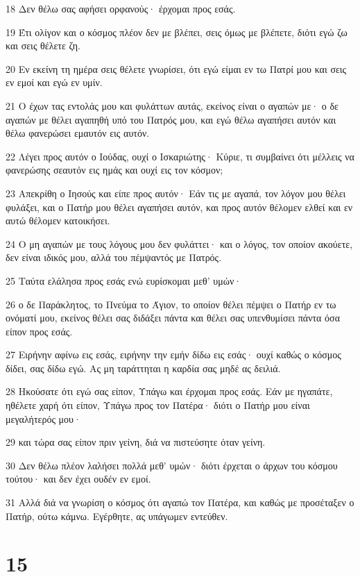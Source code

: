 \par 18 Δεν θέλω σας αφήσει ορφανούς· έρχομαι προς εσάς.
\par 19 Έτι ολίγον και ο κόσμος πλέον δεν με βλέπει, σεις όμως με βλέπετε, διότι εγώ ζω και σεις θέλετε ζη.
\par 20 Εν εκείνη τη ημέρα σεις θέλετε γνωρίσει, ότι εγώ είμαι εν τω Πατρί μου και σεις εν εμοί και εγώ εν υμίν.
\par 21 Ο έχων τας εντολάς μου και φυλάττων αυτάς, εκείνος είναι ο αγαπών με· ο δε αγαπών με θέλει αγαπηθή υπό του Πατρός μου, και εγώ θέλω αγαπήσει αυτόν και θέλω φανερώσει εμαυτόν εις αυτόν.
\par 22 Λέγει προς αυτόν ο Ιούδας, ουχί ο Ισκαριώτης· Κύριε, τι συμβαίνει ότι μέλλεις να φανερώσης σεαυτόν εις ημάς και ουχί εις τον κόσμον;
\par 23 Απεκρίθη ο Ιησούς και είπε προς αυτόν· Εάν τις με αγαπά, τον λόγον μου θέλει φυλάξει, και ο Πατήρ μου θέλει αγαπήσει αυτόν, και προς αυτόν θέλομεν ελθεί και εν αυτώ θέλομεν κατοικήσει.
\par 24 Ο μη αγαπών με τους λόγους μου δεν φυλάττει· και ο λόγος, τον οποίον ακούετε, δεν είναι ιδικός μου, αλλά του πέμψαντός με Πατρός.
\par 25 Ταύτα ελάλησα προς εσάς ενώ ευρίσκομαι μεθ' υμών·
\par 26 ο δε Παράκλητος, το Πνεύμα το Άγιον, το οποίον θέλει πέμψει ο Πατήρ εν τω ονόματί μου, εκείνος θέλει σας διδάξει πάντα και θέλει σας υπενθυμίσει πάντα όσα είπον προς εσάς.
\par 27 Ειρήνην αφίνω εις εσάς, ειρήνην την εμήν δίδω εις εσάς· ουχί καθώς ο κόσμος δίδει, σας δίδω εγώ. Ας μη ταράττηται η καρδία σας μηδέ ας δειλιά.
\par 28 Ηκούσατε ότι εγώ σας είπον, Υπάγω και έρχομαι προς εσάς. Εάν με ηγαπάτε, ηθέλετε χαρή ότι είπον, Υπάγω προς τον Πατέρα· διότι ο Πατήρ μου είναι μεγαλήτερός μου·
\par 29 και τώρα σας είπον πριν γείνη, διά να πιστεύσητε όταν γείνη.
\par 30 Δεν θέλω πλέον λαλήσει πολλά μεθ' υμών· διότι έρχεται ο άρχων του κόσμου τούτου· και δεν έχει ουδέν εν εμοί.
\par 31 Αλλά διά να γνωρίση ο κόσμος ότι αγαπώ τον Πατέρα, και καθώς με προσέταξεν ο Πατήρ, ούτω κάμνω. Εγέρθητε, ας υπάγωμεν εντεύθεν.

\chapter{15}

